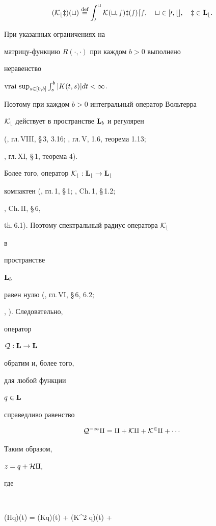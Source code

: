 $$


(\cal K_b z)(t) \eqdef \int_0^t K(t,s)z(s)ds,\quad


t\in[0,b], \quad z\in\spc L_b.


$$


При указанных ограничениях на


матрицу-функцию $R(\cdot,\cdot)$ при каждом $b>0$ выполнено


неравенство


$\vraisup_{s\in[0,b]}\int_s^b |K(t,s)|dt <\infty$.


Поэтому при каждом $b>0$ интегральный оператор Вольтерра


$\cal K_b$ действует в пространстве $\bold L_b$ и регулярен


(\cite{Kant1}, гл.\,VIII, \S\,3, 3.16; \cite{Zab}, гл.\,V, 1.6, теорема 1.13;


\cite{Kant2}, гл.\,XI, \S\,1, теорема 4).


Более того, оператор $\cal K_b:\bold L_b\to\bold L_b$


компактен (\cite{Az1}, гл.\,1, \S\,1; \cite{Az2}, Ch.\,1, \S\,1.2;


\cite{Az3}, Ch.\,II, \S\,6,


th.\,6.1). Поэтому спектральный радиус оператора $\cal K_b$


в


пространстве


$\bold L_b$


равен нулю (\cite{Zab}, гл.\,VI, \S\,6, 6.2;


\cite{Ring}, \cite{Ando}). Следовательно,


оператор


$\cal Q:\bold L\to\bold L$


обратим и, более того,


для любой функции


$q\in\bold L$


справедливо равенство


$$


\cal Q^{-1} q = q + \cal K q + \cal K^2q + \dotsb


$$





Таким образом,


$z = q + \cal H q,$


где


$$


(\cal Hq)(t) = (\cal Kq)(t) + (\cal K^2 q)(t) +


